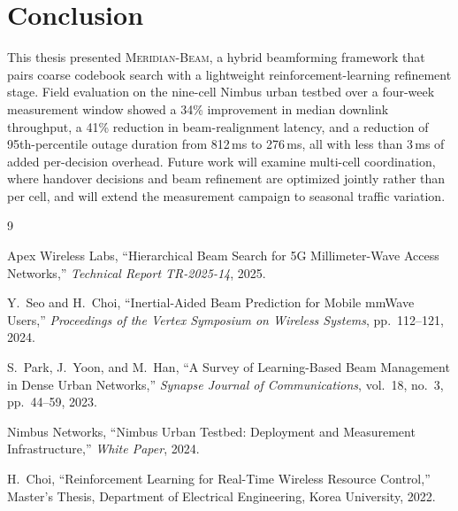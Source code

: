 \chapter{Conclusion}
\label{ch:conclusion}

This thesis presented \textsc{Meridian-Beam}, a hybrid beamforming framework
that pairs coarse codebook search with a lightweight reinforcement-learning
refinement stage. Field evaluation on the nine-cell Nimbus urban testbed over
a four-week measurement window showed a 34\% improvement in median downlink
throughput, a 41\% reduction in beam-realignment latency, and a reduction of
95th-percentile outage duration from 812\,ms to 276\,ms, all with less than
3\,ms of added per-decision overhead. Future work will examine multi-cell
coordination, where handover decisions and beam refinement are optimized
jointly rather than per cell, and will extend the measurement campaign to
seasonal traffic variation.

\clearpage
\begin{thebibliography}{9}
\small

Apex Wireless Labs, ``Hierarchical Beam Search for 5G Millimeter-Wave
Access Networks,'' \textit{Technical Report TR-2025-14}, 2025.

Y.~Seo and H.~Choi, ``Inertial-Aided Beam Prediction for Mobile mmWave
Users,'' \textit{Proceedings of the Vertex Symposium on Wireless Systems},
pp.~112--121, 2024.

S.~Park, J.~Yoon, and M.~Han, ``A Survey of Learning-Based Beam Management
in Dense Urban Networks,'' \textit{Synapse Journal of Communications},
vol.~18, no.~3, pp.~44--59, 2023.

Nimbus Networks, ``Nimbus Urban Testbed: Deployment and Measurement
Infrastructure,'' \textit{White Paper}, 2024.

H.~Choi, ``Reinforcement Learning for Real-Time Wireless Resource
Control,'' Master's Thesis, Department of Electrical Engineering, Korea
University, 2022.

\end{thebibliography}
